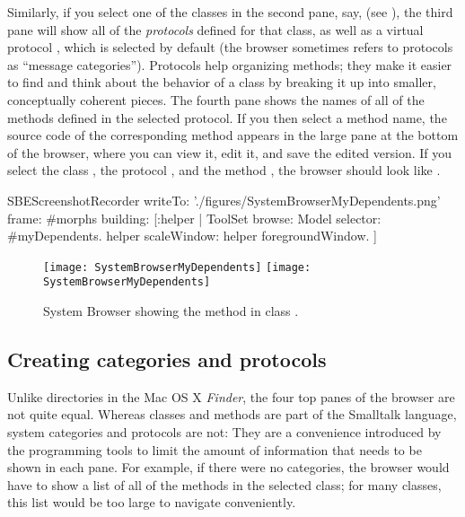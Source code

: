 \documentclass[a4paper,10pt,twoside]{book}
\begin{document}
Similarly, if you select one of the classes in the second pane, say,  (see ), the third pane will show all of the \emph{protocols} defined for that class, as well as a virtual protocol , which is selected by default (the browser sometimes refers to protocols as ``message categories'').
Protocols help organizing methods; they make it easier to find and think about the behavior of a class by breaking it up into smaller, conceptually coherent pieces.
The fourth pane shows the names of all of the methods defined in the selected protocol.
If you then select a method name, the source code of the corresponding method appears in the large pane at the bottom of the browser, where you can view it, edit it, and save the edited version.
If you select the class , the protocol , and the method , the browser should look like .

\begin{ExecuteSmalltalkScript}
SBEScreenshotRecorder writeTo: './figures/SystemBrowserMyDependents.png' frame: #morphs building: [:helper |
	ToolSet browse: Model selector: #myDependents.
	helper scaleWindow: helper foregroundWindow.
]
\end{ExecuteSmalltalkScript}
\begin{figure}[htbp]
   \centering
   \ifluluelse
	   {\texttt{[image: SystemBrowserMyDependents]}}
	   {\texttt{[image: SystemBrowserMyDependents]}}
   \caption{System Browser showing the  method in class .
   \label{fig:SystemBrowserMyDependents}}
\end{figure}


\subsection{Creating categories and protocols}
Unlike directories in the Mac OS X \emph{Finder}, the four top panes of the browser are not quite equal.
Whereas classes and methods are part of the Smalltalk language, system categories and protocols are not:
They are a convenience introduced by the programming tools to limit the amount of information that needs to be shown in each pane.
For example, if there were no categories, the browser would have to show a list of all of the methods in the selected class; for many classes, this list would be too large to navigate conveniently.
\end{document}
